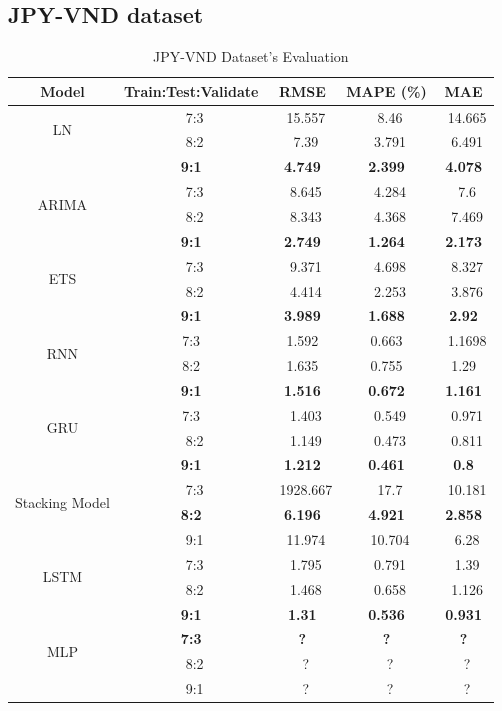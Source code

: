 \documentclass{ieeeojies}
\begin{document}
\subsection{JPY-VND dataset} 
\begin{table}[H]
    \centering
    \begin{tabular}{|c|c|c|c|c|}
         \hline
         \centering Model & Train:Test:Validate & RMSE & MAPE (\%) & MAE\\
         \hline
         \multirow{2}{*}{LN} &\ 7:3 &\ 15.557 &\ 8.46 &\ 14.665 \\ &\ 8:2 &\ 7.39 &\ 3.791 &\ 6.491 \\&\textbf{9:1} &\textbf{4.749} &\textbf{2.399} &\textbf{4.078} \\
         \hline
         \multirow{2}{*}{ARIMA} &\ 7:3 &\ 8.645 &\ 4.284 &\ 7.6 \\ &\ 8:2 &\ 8.343 &\ 4.368 &\ 7.469  \\ &\textbf{9:1} &\textbf{2.749} &\textbf{1.264} &\textbf{2.173} \\
         \hline
         \multirow{2}{*}{ETS} &\ 7:3 &\ 9.371 &\ 4.698 &\ 8.327 \\ &\ 8:2 &\ 4.414 &\ 2.253 &\ 3.876 \\&\textbf{9:1} &\textbf{3.989} &\textbf{1.688} &\textbf{2.92} \\
         \hline
         \multirow{2}{*}{RNN} &  7:3  & 1.592 & 0.663 &\ 1.1698 \\ & 8:2  & 1.635  & 0.755  & 1.29 \\&\textbf{9:1} &\textbf{1.516} &\textbf{0.672} &\textbf{1.161} \\
         \hline
         \multirow{2}{*}{GRU} &7:3&\ 1.403&\ 0.549&\ 0.971\\ &\ 8:2 &\ 1.149&\ 0.473 &\ 0.811 \\&\textbf{9:1} &\textbf{1.212} &\textbf{0.461} &\textbf{0.8} \\
         \hline
         \multirow{2}{*}{Stacking Model} &\ 7:3 &\ 1928.667 &\ 17.7 &\ 10.181 \\ &\textbf{8:2} &\textbf{6.196} &\textbf{4.921} &\textbf{2.858} \\&\ 9:1 &\ 11.974 &\ 10.704 &\ 6.28 \\
         \hline
         \multirow{2}{*}{LSTM} &\ 7:3 &\ 1.795 &\ 0.791 &\ 1.39 \\ &\ 8:2 &\ 1.468&\ 0.658 &\ 1.126 \\&\textbf{9:1} &\textbf{1.31} &\textbf{0.536} &\textbf{0.931} \\
         \hline
         \multirow{2}{*}{MLP} &\textbf{7:3} &\textbf{?}&\textbf{?}&\textbf{?} \\ &\ 8:2 &\ ?&\ ? &\ ? \\&\ 9:1 &\ ? &\ ? &\ ? \\
         \hline
    \end{tabular}
    \caption{JPY-VND Dataset's Evaluation}
    \label{mbbresult}
\end{table}
\end{document}
